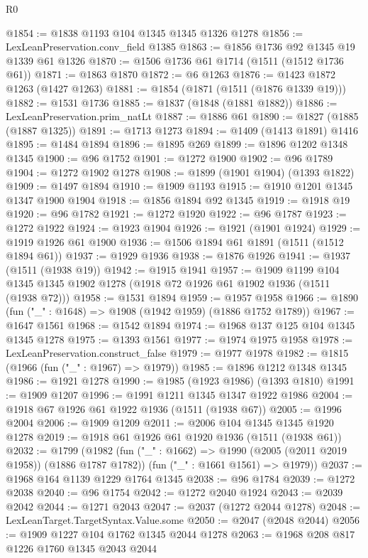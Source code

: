 \begin{lexlean}{R0}
\begin{coremodule}
@1854 := @1838 @1193 @104 @1345 @1345 @1326 @1278
@1856 := LexLeanPreservation.conv_field @1385
@1863 := @1856 @1736 @92 @1345 @19 @1339 @61 @1326
@1870 := @1506 @1736 @61 @1714 (@1511 (@1512 @1736 @61))
@1871 := @1863 @1870
@1872 := @6 @1263
@1876 := @1423 @1872 @1263 (@1427 @1263)
@1881 := @1854 (@1871 (@1511 (@1876 @1339 @19)))
@1882 := @1531 @1736
@1885 := @1837 (@1848 (@1881 @1882))
@1886 := LexLeanPreservation.prim_natLt
@1887 := @1886 @61
@1890 := @1827 (@1885 (@1887 @1325))
@1891 := @1713 @1273
@1894 := @1409 (@1413 @1891) @1416
@1895 := @1484 @1894
@1896 := @1895 @269
@1899 := @1896 @1202 @1348 @1345
@1900 := @96 @1752
@1901 := @1272 @1900
@1902 := @96 @1789
@1904 := @1272 @1902 @1278
@1908 := @1899 (@1901 @1904) (@1393 @1822)
@1909 := @1497 @1894
@1910 := @1909 @1193
@1915 := @1910 @1201 @1345 @1347 @1900 @1904
@1918 := @1856 @1894 @92 @1345
@1919 := @1918 @19
@1920 := @96 @1782
@1921 := @1272 @1920
@1922 := @96 @1787
@1923 := @1272 @1922
@1924 := @1923 @1904
@1926 := @1921 (@1901 @1924)
@1929 := @1919 @1926 @61 @1900
@1936 := @1506 @1894 @61 @1891 (@1511 (@1512 @1894 @61))
@1937 := @1929 @1936
@1938 := @1876 @1926
@1941 := @1937 (@1511 (@1938 @19))
@1942 := @1915 @1941
@1957 := @1909
    @1199
    @104
    @1345
    @1345
    @1902
    @1278
    (@1918 @72 @1926 @61 @1902 @1936 (@1511 (@1938 @72)))
@1958 := @1531 @1894
@1959 := @1957 @1958
@1966 := @1890 (fun ("_" : @1648) => @1908 (@1942 @1959) (@1886 @1752 @1789))
@1967 := @1647 @1561
@1968 := @1542 @1894
@1974 := @1968 @137 @125 @104 @1345 @1345 @1278
@1975 := @1393 @1561
@1977 := @1974 @1975 @1958
@1978 := LexLeanPreservation.construct_false
@1979 := @1977 @1978
@1982 := @1815 (@1966 (fun ("_" : @1967) => @1979))
@1985 := @1896 @1212 @1348 @1345
@1986 := @1921 @1278
@1990 := @1985 (@1923 @1986) (@1393 @1810)
@1991 := @1909 @1207
@1996 := @1991 @1211 @1345 @1347 @1922 @1986
@2004 := @1918 @67 @1926 @61 @1922 @1936 (@1511 (@1938 @67))
@2005 := @1996 @2004
@2006 := @1909 @1209
@2011 := @2006 @104 @1345 @1345 @1920 @1278
@2019 := @1918 @61 @1926 @61 @1920 @1936 (@1511 (@1938 @61))
@2032 := @1799
    (@1982
      (fun ("_" : @1662) => @1990 (@2005 (@2011 @2019 @1958)) (@1886 @1787 @1782))
      (fun ("_" : @1661 @1561) => @1979))
@2037 := @1968 @164 @1139 @1229 @1764 @1345
@2038 := @96 @1784
@2039 := @1272 @2038
@2040 := @96 @1754
@2042 := @1272 @2040 @1924
@2043 := @2039 @2042
@2044 := @1271 @2043
@2047 := @2037 (@1272 @2044 @1278)
@2048 := LexLeanTarget.TargetSyntax.Value.some
@2050 := @2047 (@2048 @2044)
@2056 := @1909 @1227 @104 @1762 @1345 @2044 @1278
@2063 := @1968 @208 @817 @1226 @1760 @1345 @2043 @2044

\end{coremodule}
\end{lexlean}
